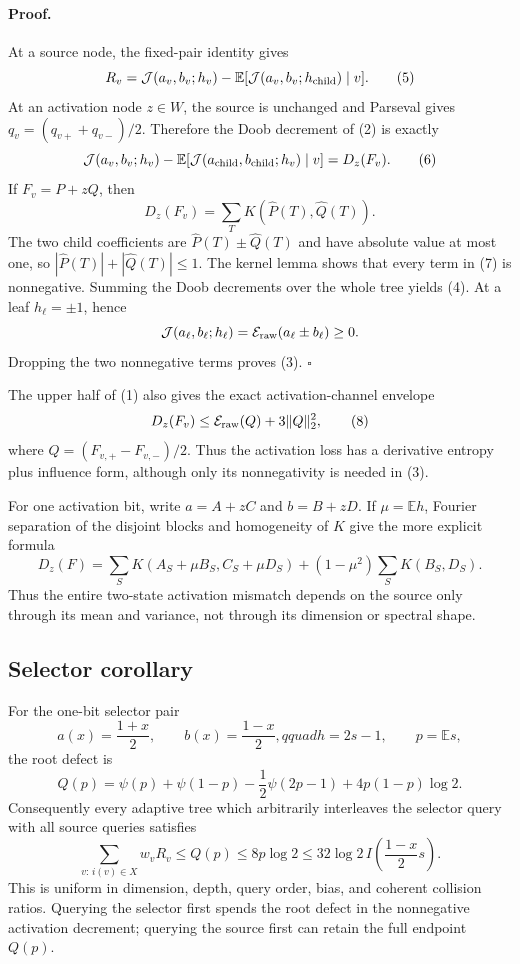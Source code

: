 \paragraph{Proof.}
At a source node, the fixed-pair identity gives
\[
 R_v=\mathcal J(a_v,b_v;h_v)
   -\mathbb E[\mathcal J(a_v,b_v;h_{\rm child})\mid v].           \tag{5}
\]
At an activation node $z\in W$, the source is unchanged and Parseval gives
$q_v=(q_{v+}+q_{v-})/2$.  Therefore the Doob decrement of (2) is exactly
\[
 \mathcal J(a_v,b_v;h_v)
 -\mathbb E[\mathcal J(a_{\rm child},b_{\rm child};h_v)\mid v]
 =D_z(F_v).                                                        \tag{6}
\]
If $F_v=P+zQ$, then
\[
 D_z(F_v)=\sum_TK(\widehat P(T),\widehat Q(T)).                    \tag{7}
\]
The two child coefficients are $\widehat P(T)\pm\widehat Q(T)$ and have
absolute value at most one, so
$|\widehat P(T)|+|\widehat Q(T)|\le1$.  The kernel lemma shows that every
term in (7) is nonnegative.  Summing the Doob decrements over the whole
tree yields (4).  At a leaf $h_\ell=\pm1$, hence
\[
 \mathcal J(a_\ell,b_\ell;h_\ell)
 =\mathcal E_{\rm raw}(a_\ell\pm b_\ell)\ge0.
\]
Dropping the two nonnegative terms proves (3). \(\square\)

The upper half of (1) also gives the exact activation-channel envelope
\[
 D_z(F_v)\le\mathcal E_{\rm raw}(Q)+3\|Q\|_2^2,                   \tag{8}
\]
where $Q=(F_{v,+}-F_{v,-})/2$.  Thus the activation loss has a derivative
entropy plus influence form, although only its nonnegativity is needed in
(3).

For one activation bit, write $a=A+zC$ and $b=B+zD$.  If
$\mu=\mathbb Eh$, Fourier separation of the disjoint blocks and homogeneity
of $K$ give the more explicit formula
\[
 D_z(F)=\sum_S K(A_S+\mu B_S,C_S+\mu D_S)
       +(1-\mu^2)\sum_S K(B_S,D_S).                    \tag{9}
\]
Thus the entire two-state activation mismatch depends on the source only
through its mean and variance, not through its dimension or spectral shape.

\subsection*{Selector corollary}

For the one-bit selector pair
\[
 a(x)=\frac{1+x}{2},\qquad b(x)=\frac{1-x}{2},qquad h=2s-1,
 \qquad p=\mathbb Es,
\]
the root defect is
\[
 Q(p)=\psi(p)+\psi(1-p)-\frac12\psi(2p-1)+4p(1-p)\log2.
\]
Consequently every adaptive tree which arbitrarily interleaves the selector
query with all source queries satisfies
\[
 \sum_{v:\,i(v)\in X}w_vR_v
 \le Q(p)\le8p\log2\le32\log2\,I\!\left(\frac{1-x}{2}s\right).   \tag{10}
\]
This is uniform in dimension, depth, query order, bias, and coherent
collision ratios.  Querying the selector first spends the root defect in
the nonnegative activation decrement; querying the source first can retain
the full endpoint $Q(p)$.

